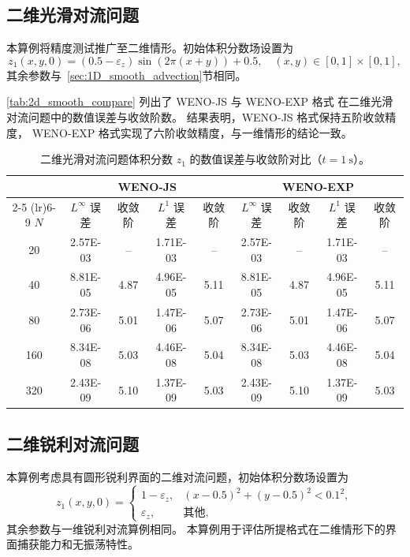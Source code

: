 \documentclass[12pt,a4paper]{article}
\numberwithin{equation}{section}    %
\begin{document}
\subsection{二维光滑对流问题}

本算例将精度测试推广至二维情形。初始体积分数场设置为
\begin{equation}
    z_1(x, y, 0) = (0.5 - \varepsilon_z)\sin(2\pi(x + y)) + 0.5,
    \quad (x, y) \in [0, 1] \times [0, 1],
\end{equation}
其余参数与~\autoref{sec:1D_smooth_advection}节相同。

\autoref{tab:2d_smooth_compare} 列出了 WENO-JS 与 WENO-EXP 格式
在二维光滑对流问题中的数值误差与收敛阶数。
结果表明，WENO-JS 格式保持五阶收敛精度，
WENO-EXP 格式实现了六阶收敛精度，与一维情形的结论一致。

\begin{table}[!ht]
    \centering
    \caption{二维光滑对流问题体积分数 $z_1$ 的数值误差与收敛阶对比（$t = 1~\mathrm{s}$）。}
    \label{tab:2d_smooth_compare}
    \begin{tabular}{ccccccccc}
        \toprule
        & \multicolumn{4}{c}{WENO-JS} & \multicolumn{4}{c}{WENO-EXP} \\
        \cmidrule(lr){2-5} \cmidrule(lr){6-9}
        $N$
        & $L^\infty$ 误差 & 收敛阶
        & $L^1$ 误差 & 收敛阶
        & $L^\infty$ 误差 & 收敛阶
        & $L^1$ 误差 & 收敛阶 \\
        \midrule
        20  & 2.57E-03 & --   & 1.71E-03 & --   & 2.57E-03 & --   & 1.71E-03 & --   \\
        40  & 8.81E-05 & 4.87 & 4.96E-05 & 5.11 & 8.81E-05 & 4.87 & 4.96E-05 & 5.11 \\
        80  & 2.73E-06 & 5.01 & 1.47E-06 & 5.07 & 2.73E-06 & 5.01 & 1.47E-06 & 5.07 \\
        160 & 8.34E-08 & 5.03 & 4.46E-08 & 5.04 & 8.34E-08 & 5.03 & 4.46E-08 & 5.04 \\
        320 & 2.43E-09 & 5.10 & 1.37E-09 & 5.03 & 2.43E-09 & 5.10 & 1.37E-09 & 5.03 \\
        \bottomrule
    \end{tabular}
\end{table}


\subsection{二维锐利对流问题}
\label{sec:2D_sharp}

本算例考虑具有圆形锐利界面的二维对流问题，初始体积分数场设置为
\begin{equation}
    z_1(x, y, 0) = \begin{cases}
        1 - \varepsilon_z, & (x - 0.5)^2 + (y - 0.5)^2 < 0.1^2, \\
        \varepsilon_z,     & \text{其他},
    \end{cases}
\end{equation}
其余参数与一维锐利对流算例相同。
本算例用于评估所提格式在二维情形下的界面捕获能力和无振荡特性。
\end{document}
